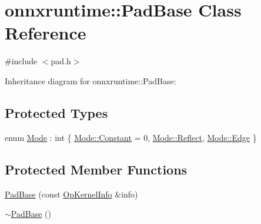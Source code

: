 \hypertarget{classonnxruntime_1_1PadBase}{}\section{onnxruntime\+:\+:Pad\+Base Class Reference}
\label{classonnxruntime_1_1PadBase}


{\ttfamily \#include $<$pad.\+h$>$}



Inheritance diagram for onnxruntime\+:\+:Pad\+Base\+:
\subsection*{Protected Types}
\begin{DoxyCompactItemize}
\item 
enum \mbox{\hyperlink{classonnxruntime_1_1PadBase_a9dccdf2fa457b3cd7322d0e79a2e53cb}{Mode}} \+: int \{ \mbox{\hyperlink{classonnxruntime_1_1PadBase_a9dccdf2fa457b3cd7322d0e79a2e53cbacb17869fe51048b5a5c4c6106551a255}{Mode\+::\+Constant}} = 0, 
\mbox{\hyperlink{classonnxruntime_1_1PadBase_a9dccdf2fa457b3cd7322d0e79a2e53cba74de3e45e4491e956e8dc18d841d9b00}{Mode\+::\+Reflect}}, 
\mbox{\hyperlink{classonnxruntime_1_1PadBase_a9dccdf2fa457b3cd7322d0e79a2e53cbae4a297a0f76119a442c2595ac040673e}{Mode\+::\+Edge}}
 \}
\end{DoxyCompactItemize}
\subsection*{Protected Member Functions}
\begin{DoxyCompactItemize}
\item 
\mbox{\hyperlink{classonnxruntime_1_1PadBase_a7a994ce532bb95fed45b722277ddff59}{Pad\+Base}} (const \mbox{\hyperlink{classonnxruntime_1_1OpKernelInfo}{Op\+Kernel\+Info}} \&info)
\item 
\mbox{\hyperlink{classonnxruntime_1_1PadBase_a784dbc912e637a4c071c3f96c4254aa4}{$\sim$\+Pad\+Base}} ()
\end{DoxyCompactItemize}
